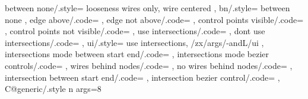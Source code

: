 {{    %
    between none/.style={
      looseness wires only,
      wire centered
    },
    bn/.style={
      between none
    },
    edge above/.code={%
      \def\zxEdgesAbove{}%
    },%
    edge not above/.code={%
      \let\zxEdgesAbove\undefined%
    },
    control points visible/.code={%
      \def\zxControlPointsVisible{}%
    },%
    control points not visible/.code={%
      \let\zxControlPointsVisible\undefined%
    },
    use intersections/.code={%
      \def\zxEnableIntersectionsWires{}%
    },
    dont use intersections/.code={%
      \let\zxEnableIntersectionsWires\undefined%
    },
    ui/.style={
      use intersections,
      /zx/args/-andL/ui
    },
    intersections mode between start end/.code={%
      \def\zxIntersectionLineBetweenStartEnd{}%
    },
    intersections mode bezier controls/.code={%
      \let\zxIntersectionLineBetweenStartEnd\undefined%
    },
    wires behind nodes/.code={%
      \def\zxWireInsideIfNoIntersectionName{}%
    },
    no wires behind nodes/.code={%
      \let\zxWireInsideIfNoIntersectionName\undefined%
    },
    intersection between start end/.code={
      \def\zxIntersectionLineBetweenStartEnd{}%
    },
    intersection bezier control/.code={
      \let\zxIntersectionLineBetweenStartEnd\undefined%
    },
    C@generic/.style n args={8}{ %
}}}
